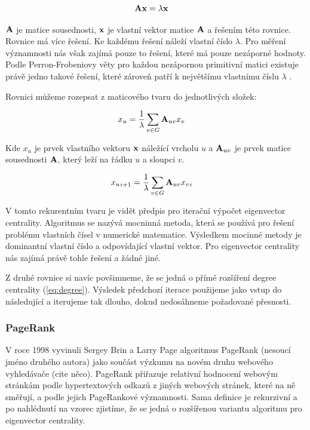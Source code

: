 \documentclass{bakalarka}
\begin{document}
\begin{align}
{\bf Ax} &= \lambda {\bf x}
\end{align}

${\bf A}$ je matice sousednosti, ${\bf x}$ je vlastní vektor matice ${\bf A}$ a
řešením této rovnice. Rovnice má více řešení. Ke každému řešení náleží vlastní
číslo $\lambda$. Pro měření významnosti nás však zajímá pouze to řešení, které
má pouze nezáporné hodnoty. Podle Perron-Frobeniovy věty pro každou nezápornou
primitivní matici existuje právě jedno takové řešení, které zároveň patří k
největšímu vlastnímu číslu $\lambda$ \cite{langvillemeyer}.

Rovnici můžeme rozepsat z maticového tvaru do jednotlivých složek:

\begin{align} 
x_u &=  \frac{1}{\lambda} \displaystyle\sum_{v \in G} {\bf A}_{uv} x_v 
\end{align} 

Kde $x_u$ je prvek vlastního vektoru ${\bf x}$
náležící vrcholu $u$ a ${\bf A}_{uv}$ je prvek matice sousednosti ${\bf A}$,
který leží na řádku $u$ a sloupci $v$.

\begin{align} 
{x_u}_{i + 1} &=  \frac{1}{\lambda} \displaystyle\sum_{v \in G} {\bf A}_{uv}
{x_v}_{i}
\end{align} 

V tomto rekurentním tvaru je vidět předpis pro iterační výpočet eigenvector
centrality. Algoritmus se nazývá mocninná metoda, která se používá pro řešení
problému vlastních čísel v numerické matematice. Výsledkem mocinné metody je
dominantní vlastní číslo a odpovídající vlastní vektor. Pro eigenvector
centrality nás zajímá právě tohle řešení a žádné jiné.

Z druhé rovnice si navíc povšimneme, že se jedná o přímé rozšíření degree
centrality (\ref{eq:degree}). Výsledek předchozí iterace použijeme jako vstup
do následující a iterujeme tak dlouho, dokud nedosáhneme požadované přesnosti.

\subsubsection{PageRank}
V roce 1998 vyvinuli Sergey Brin a Larry Page algoritmus PageRank (nesoucí
jméno druhého autora) jako součást výzkumu na novém druhu webového vyhledávače
(cite něco). PageRank přiřazuje relativní hodnocení webovým stránkám podle
hypertextových odkazů z jiných webových stránek, které na ně směřují, a podle
jejich PageRankové významnosti. Sama definice je rekurzivní a po nahlédnutí na
vzorec zjistíme, že se jedná o rozšířenou variantu algoritmu pro eigenvector
centrality.
\end{document}
